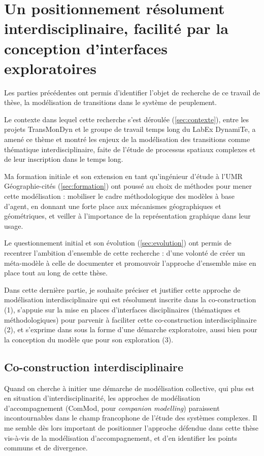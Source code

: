 \let\orisectionmark\sectionmark
\renewcommand\sectionmark[1]{}%
\section{Un positionnement résolument interdisciplinaire, facilité par la conception d'interfaces exploratoires}
\orisectionmark{Un positionnement résolument interdisciplinaire}
\let\sectionmark\orisectionmark

Les parties précédentes ont permis d'identifier l'objet de recherche de ce travail de thèse, la modélisation de transitions dans le système de peuplement.

Le contexte dans lequel cette recherche s'est déroulée (\cref{sec:contexte}), entre les projets TransMonDyn et le groupe de travail \og temps long\fg{} du LabEx DynamiTe, a amené ce thème et montré les enjeux de la modélisation des transitions comme thématique interdisciplinaire, faite de l'étude de processus spatiaux complexes et de leur inscription dans le temps long.

Ma formation initiale et son extension en tant qu'ingénieur d'étude à l'UMR Géographie-cités (\cref{sec:formation}) ont poussé au choix de méthodes pour mener cette modélisation :
	mobiliser le cadre méthodologique des modèles à base d'agent, en donnant une forte place aux mécanismes géographiques et géométriques, et veiller à l'importance de la représentation graphique dans leur usage.

Le questionnement initial et son évolution (\cref{sec:evolution}) ont permis de recentrer l'ambition d'ensemble de cette recherche : d'une volonté de créer un méta-modèle à celle de documenter et promouvoir l'approche d'ensemble mise en place tout au long de cette thèse.

Dans cette dernière partie, je souhaite préciser et justifier cette approche de modélisation interdisciplinaire qui est résolument inscrite dans la co-construction (1), s'appuie sur la mise en places d'interfaces disciplinaires (thématiques et méthodologiques) pour parvenir à faciliter cette co-construction interdisciplinaire (2), et s'exprime dans sous la forme d'une démarche exploratoire, aussi bien pour la conception du modèle que pour son exploration (3).


\subsection{Co-construction interdisciplinaire}

Quand on cherche à initier une démarche de modélisation collective, qui plus est en situation d'interdisciplinarité, les approches de modélisation d'accompagnement (\og ComMod\fg{}, pour \textit{companion modelling}) paraissent incontournables dans le champ francophone de l'étude des systèmes complexes.
Il me semble dès lors important de positionner l'approche défendue dans cette thèse vis-à-vis de la modélisation d'accompagnement, et d'en identifier les points communs et de divergence.

